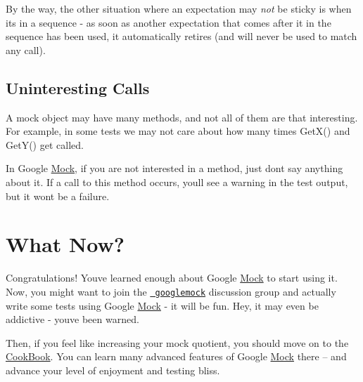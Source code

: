 By the way, the other situation where an expectation may {\itshape not} be sticky is when it\textquotesingle{}s in a sequence -\/ as soon as another expectation that comes after it in the sequence has been used, it automatically retires (and will never be used to match any call).

\subsection*{Uninteresting Calls}

A mock object may have many methods, and not all of them are that interesting. For example, in some tests we may not care about how many times {\ttfamily Get\+X()} and {\ttfamily Get\+Y()} get called.

In Google \mbox{\hyperlink{classMock}{Mock}}, if you are not interested in a method, just don\textquotesingle{}t say anything about it. If a call to this method occurs, you\textquotesingle{}ll see a warning in the test output, but it won\textquotesingle{}t be a failure.

\section*{What Now?}

Congratulations! You\textquotesingle{}ve learned enough about Google \mbox{\hyperlink{classMock}{Mock}} to start using it. Now, you might want to join the \href{http://groups.google.com/group/googlemock}{\texttt{ googlemock}} discussion group and actually write some tests using Google \mbox{\hyperlink{classMock}{Mock}} -\/ it will be fun. Hey, it may even be addictive -\/ you\textquotesingle{}ve been warned.

Then, if you feel like increasing your mock quotient, you should move on to the \mbox{\hyperlink{CookBook_8md}{Cook\+Book}}. You can learn many advanced features of Google \mbox{\hyperlink{classMock}{Mock}} there -- and advance your level of enjoyment and testing bliss. 